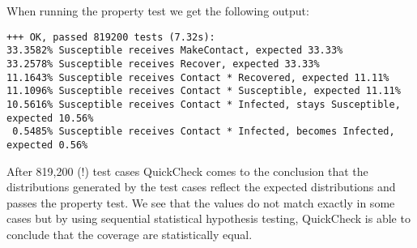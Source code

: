 When running the property test we get the following output:

\begin{footnotesize}
\begin{verbatim}
+++ OK, passed 819200 tests (7.32s):
33.3582% Susceptible receives MakeContact, expected 33.33%
33.2578% Susceptible receives Recover, expected 33.33%
11.1643% Susceptible receives Contact * Recovered, expected 11.11%
11.1096% Susceptible receives Contact * Susceptible, expected 11.11%
10.5616% Susceptible receives Contact * Infected, stays Susceptible, expected 10.56%
 0.5485% Susceptible receives Contact * Infected, becomes Infected, expected 0.56%
\end{verbatim}
\end{footnotesize}

After 819,200 (!) test cases QuickCheck comes to the conclusion that the distributions generated by the test cases reflect the expected distributions and passes the property test. We see that the values do not match exactly in some cases but by using sequential statistical hypothesis testing, QuickCheck is able to conclude that the coverage are statistically equal.